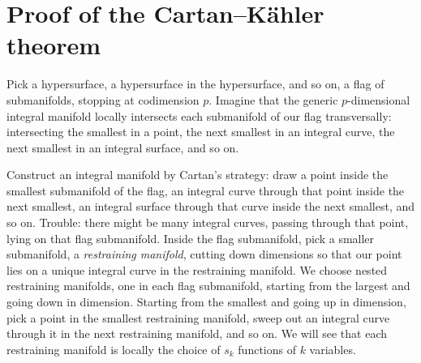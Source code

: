 \chapter{%
\texorpdfstring{Proof of the Cartan--K\"ahler theorem}%
{Proof of the Cartan--Kaehler theorem}%
}%
\label{chapter:proof}%
%
Pick a hypersurface, a hypersurface in the hypersurface, and so on, a flag of submanifolds, stopping at codimension \(p\).
Imagine that the generic \(p\)-dimensional integral manifold locally intersects each submanifold of our flag transversally: intersecting the smallest in a point, the next smallest in an integral curve, the next smallest in an integral surface, and so on.

Construct an integral manifold by Cartan's strategy: draw a point inside the smallest submanifold of the flag, an integral curve through that point inside the next smallest, an integral surface through that curve inside the next smallest, and so on.
Trouble: there might be many integral curves, passing through that point, lying on that flag submanifold.
Inside the flag submanifold, pick a smaller submanifold, a \emph{restraining manifold}, cutting down dimensions so that our point lies on a unique integral curve in the restraining manifold.
We choose nested restraining manifolds, one in each flag submanifold, starting from the largest and going down in dimension.
Starting from the smallest and going up in dimension, pick a point in the smallest restraining manifold, sweep out an integral curve through it in the next restraining manifold, and so on.
We will see that each restraining manifold is locally the choice of \(s_k\) functions of \(k\) variables.

